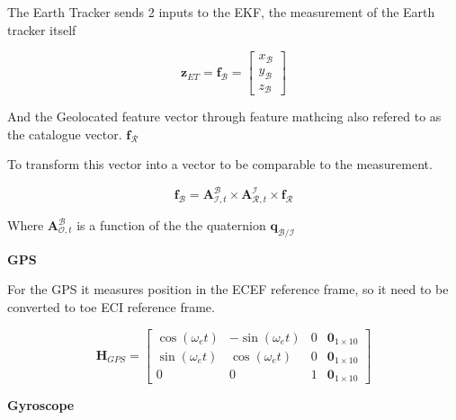 \label{sec:statemeasuremtmodel}


The Earth Tracker sends 2 inputs to the EKF, the measurement of the Earth tracker itself 

\begin{equation}
    \mathbf{z}_{ET} = \mathbf{f}_\mathcal{B} =
    \begin{bmatrix}
        x_\mathcal{B} \\
        y_\mathcal{B} \\
        z_\mathcal{B}
    \end{bmatrix}
\end{equation}

And the Geolocated feature vector through feature mathcing also refered to as the catalogue vector. $ \mathbf{f}_\mathcal{R}$

To transform this vector into a vector to be comparable to the measurement.

\begin{equation}
    \mathbf{f}_\mathcal{B} = \mathbf{A}_{\mathcal{I},t}^\mathcal{B} \times \mathbf{A}_{\mathcal{R},t}^\mathcal{I} \times \mathbf{f}_\mathcal{R}
\end{equation}


Where $\mathbf{A}_{\mathcal{O},t}^\mathcal{B}$ is a function of the the quaternion $\mathbf{q}_\mathcal{B/I}$






\textbf{GPS}

For the GPS it measures position in the ECEF reference frame, so it need to be converted to toe ECI reference frame.

\begin{equation}
    \mathbf{H}_{GPS} = 
    \begin{bmatrix}
        \cos(\omega_et) & -\sin(\omega_et) & 0 & \mathbf{0}_{1\times10} \\
        \sin(\omega_et) & \cos(\omega_et) & 0 & \mathbf{0}_{1\times10} \\
        0 & 0 & 1 & \mathbf{0}_{1\times10}
    \end{bmatrix}
\end{equation}

\textbf{Gyroscope}

